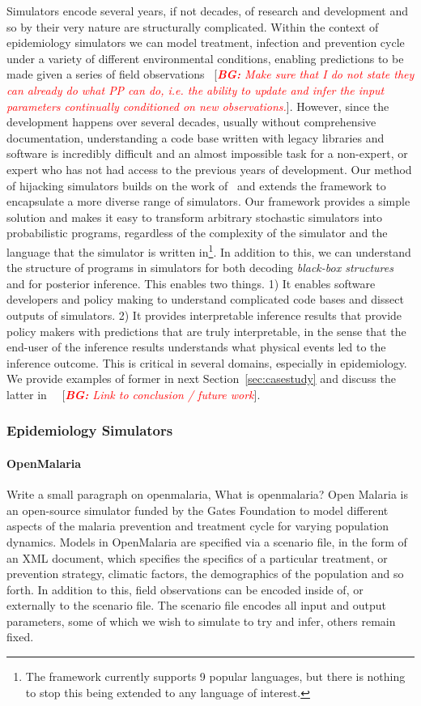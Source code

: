 \documentclass{article}
\newcommand{\bg}[1]{~{{[{\it \textcolor{red}{{\bf BG:} #1}}]}}}
\begin{document}
Simulators encode several years, if not decades, of research and development and so by their very nature are structurally complicated. Within the context of epidemiology simulators we can model treatment, infection and prevention cycle under a variety of different environmental conditions, enabling predictions to be made given a series of field observations \bg{Make sure that I do not state they can already do what PP can do, i.e. the ability to update and infer the input parameters continually conditioned on new observations.}.
However, since the development happens over several decades, usually without comprehensive documentation, understanding a code base written with legacy libraries and software is incredibly difficult and an almost impossible task for a non-expert, or expert who has not had access to the previous years of development. 
Our method of hijacking simulators builds on the work of~\cite{baydin2018efficient} and extends the framework to encapsulate a more diverse range of simulators. Our framework provides a simple solution and makes it easy to transform arbitrary stochastic simulators into probabilistic programs, regardless of the complexity of the simulator and the language that the simulator is written in\footnote{The framework currently supports 9 popular languages, but there is nothing to stop this being extended to any language of interest.}. 
In addition to this, we can understand the structure of programs in simulators for both decoding \emph{black-box structures} and for posterior inference. This enables two things. 
1) It enables software developers and policy making to understand complicated code bases and dissect outputs of simulators.
 2) It provides interpretable inference results that provide policy makers with predictions that are truly interpretable, in the sense that the end-user of the inference results understands what physical events led to the inference outcome. 
 This is critical in several domains, especially in epidemiology. 
 We provide examples of former in next Section~\ref{sec:casestudy} and discuss the latter in ~\bg{Link to conclusion / future work}.


 \subsubsection*{Epidemiology Simulators}
 \paragraph*{OpenMalaria} Write a small paragraph on openmalaria, 
 What is openmalaria? Open Malaria is an open-source simulator funded by the Gates Foundation to model different  aspects of the malaria prevention and treatment cycle for varying population dynamics.
 Models in OpenMalaria are specified via a scenario file, in the form of an XML document, which specifies the specifics of a particular treatment, or prevention strategy, climatic factors, the demographics of the population and so forth. In addition to this, field observations can be encoded inside of, or externally to the scenario file. 
The scenario file encodes all input and output parameters, some of which we wish to simulate to try and infer, others remain fixed. 
\end{document}
